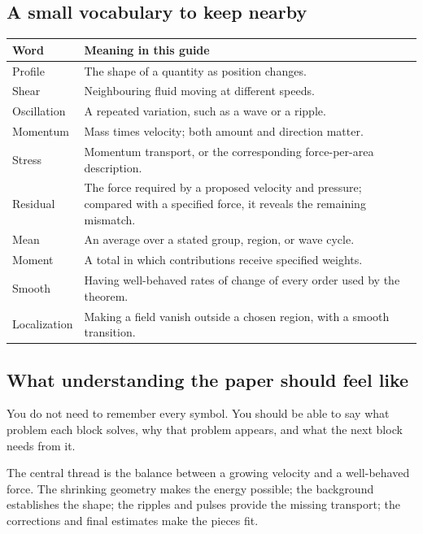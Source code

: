 \documentclass[
  english,
  11pt,
]{article}
\newcounter{none} %
\begin{document}
\subsection{A small vocabulary to keep
nearby}\label{a-small-vocabulary-to-keep-nearby}

{\def\LTcaptype{none} %
\begin{longtable}[]{@{}
  >{\raggedright\arraybackslash}p{}
  >{\raggedright\arraybackslash}p{}@{}}
\toprule\noalign{}
\begin{minipage}[b]{\linewidth}\raggedright
Word
\end{minipage} & \begin{minipage}[b]{\linewidth}\raggedright
Meaning in this guide
\end{minipage} \\
\midrule\noalign{}
\endhead
\bottomrule\noalign{}
\endlastfoot
Profile & The shape of a quantity as position changes. \\
Shear & Neighbouring fluid moving at different speeds. \\
Oscillation & A repeated variation, such as a wave or a ripple. \\
Momentum & Mass times velocity; both amount and direction matter. \\
Stress & Momentum transport, or the corresponding force-per-area
description. \\
Residual & The force required by a proposed velocity and pressure;
compared with a specified force, it reveals the remaining mismatch. \\
Mean & An average over a stated group, region, or wave cycle. \\
Moment & A total in which contributions receive specified weights. \\
Smooth & Having well-behaved rates of change of every order used by the
theorem. \\
Localization & Making a field vanish outside a chosen region, with a
smooth transition. \\
\end{longtable}
}

\subsection{What understanding the paper should feel
like}\label{what-understanding-the-paper-should-feel-like}

You do not need to remember every symbol. You should be able to say what
problem each block solves, why that problem appears, and what the next
block needs from it.

The central thread is the balance between a growing velocity and a
well-behaved force. The shrinking geometry makes the energy possible;
the background establishes the shape; the ripples and pulses provide the
missing transport; the corrections and final estimates make the pieces
fit.
\end{document}

